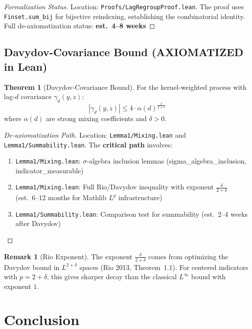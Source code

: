 \documentclass[final,3p,twocolumn,times,authoryear]{elsarticle}
\theoremstyle{definition}
\newtheorem{theorem}{Theorem}[section]
\newtheorem{remark}{Remark}[section]
\begin{document}
\begin{proof}[Formalization Status]
Location: \texttt{Proofs/LagRegroupProof.lean}. The proof uses \texttt{Finset.sum\_bij} for bijective reindexing, establishing the combinatorial identity. Full de-axiomatization status: \textbf{est.~4--8 weeks}
\end{proof}

\subsection{Davydov-Covariance Bound (AXIOMATIZED in Lean)}

\begin{theorem}[Davydov-Covariance Bound]
\label{thm:davydov-cov}
For the kernel-weighted process with lag-$d$ covariance $\gamma_d(y,z)$:
\begin{equation}
|\gamma_d(y,z)| \leq 4 \cdot \alpha(d)^{\frac{\delta}{2+\delta}}
\end{equation}
where $\alpha(d)$ are strong mixing coefficients and $\delta > 0$.
\end{theorem}

\begin{proof}[De-axiomatization Path]
Location: \texttt{Lemma1/Mixing.lean} and \texttt{Lemma1/Summability.lean}. The \textbf{critical path} involves:
\begin{enumerate}
    \item \texttt{Lemma1/Mixing.lean}: $\sigma$-algebra inclusion lemmas (sigma\_algebra\_inclusion, indicator\_measurable)
    \item \texttt{Lemma1/Mixing.lean}: Full Rio/Davydov inequality with exponent $\frac{\delta}{2+\delta}$ (est.\ 6--12 months for Mathlib $L^p$ infrastructure)
    \item \texttt{Lemma1/Summability.lean}: Comparison test for summability (est.\ 2--4 weeks after Davydov)
\end{enumerate}
\end{proof}

\begin{remark}[Rio Exponent]
The exponent $\frac{\delta}{2+\delta}$ comes from optimizing the Davydov bound in $L^{2+\delta}$ spaces (Rio 2013, Theorem~1.1). For centered indicators with $p = 2+\delta$, this gives sharper decay than the classical $L^\infty$ bound with exponent $1$.
\end{remark}

\section{Conclusion}
\label{sec:conclusion}
\end{document}
